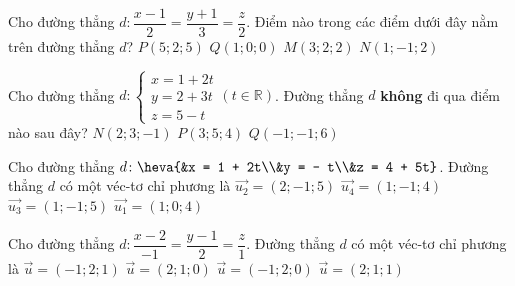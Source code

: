\begin{ex}
	Cho đường thẳng $d: \dfrac{x-1}{2}=\dfrac{y+1}{3}=\dfrac{z}{2}$. Điểm nào trong các điểm dưới đây nằm trên đường thẳng $d$?
	\choice
	{$P(5;2;5)$}
	{$Q(1;0;0)$}
	{\True $M(3;2;2)$}
	{$N(1;-1;2)$}
	\loigiai{
	}
\end{ex}
\begin{ex}
	Cho đường thẳng $d: \begin{cases}
		x=1+2t \\
		y=2+3t \\
		z=5-t
	\end{cases}(t\in \mathbb{R})$. Đường thẳng $d$ \textbf{không} đi qua điểm nào sau đây?
	{\True $N(2;3;-1)$}
	{$P(3;5;4)$}
	{$Q(-1;-1;6)$} 
	\loigiai{
	}
\end{ex}
\begin{ex}
	Cho đường thẳng $d\colon \heva{&x = 1 + 2t\\&y = - t\\&z = 4 + 5t}$. Đường thẳng $d$ có một véc-tơ chỉ phương là
	\choice
	{\True $\overrightarrow{u_2} = \left(2;-1;5\right)$}
	{$\overrightarrow{u_4} = \left(1;-1;4\right)$}
	{$\overrightarrow{u_3} = \left(1;-1;5\right)$}
	{$\overrightarrow{u_1} = \left(1;0;4\right)$}
\end{ex}
\begin{ex}
	Cho đường thẳng $d\colon \dfrac{x-2}{-1}=\dfrac{y-1}{2}=\dfrac{z}{1}$. Đường thẳng $d$ có một véc-tơ chỉ phương là
	\choice
	{\True $\vec{u}=(-1;2;1)$}
	{ $\vec{u}=(2;1;0)$}
	{ $\vec{u}=(-1;2;0)$}
	{ $\vec{u}=(2;1;1)$}
\end{ex}

